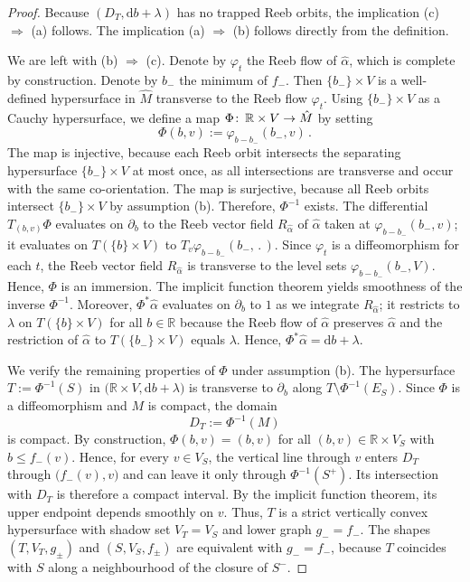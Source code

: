 \documentclass{amsart}
\theoremstyle{definition}
\def\co{\colon\thinspace}
\newcommand{\rmd}{\mathrm d}
\newcommand{\R}{\mathbb R}
\newcommand{\ra}{\rightarrow}
\begin{document}
\begin{proof}
  Because $(D_T,\rmd b+\lambda)$
  has no trapped Reeb orbits,
  the implication (c) $\Rightarrow$ (a) follows.
  The implication (a) $\Rightarrow$ (b)
  follows directly from the definition. 
  
  We are left with (b) $\Rightarrow$ (c).
  Denote by $\varphi_t$ the Reeb flow of $\hat{\alpha}$,
  which is complete by construction.
  Denote by $b_-$ the minimum of $f_-$.
  Then $\{b_-\}\times V$ is a well-defined
  hypersurface in $\hat{M}$ transverse
  to the Reeb flow $\varphi_t$.
  Using $\{b_-\}\times V$ as a Cauchy hypersurface,
  we define a map $\Phi\co\R\times V\ra\hat{M}$ by setting
  \[
    \Phi(b,v):=\varphi_{b-b_-}(b_-,v)
    \,.
  \]
  The map is injective,
  because each Reeb orbit intersects
  the separating hypersurface $\{b_-\}\times V$ at most once,
  as all intersections are transverse and
  occur with the same co-orientation.
  The map is surjective,
  because all Reeb orbits intersect $\{b_-\}\times V$
  by assumption (b).
  Therefore, $\Phi^{-1}$ exists.
  The differential $T_{(b,v)}\Phi$ evaluates on $\partial_b$ to
  the Reeb vector field $R_{\hat{\alpha}}$ of $\hat{\alpha}$
  taken at $\varphi_{b-b_-}(b_-,v)$;
  it evaluates on $T(\{b\}\times V)$ to $T_v\varphi_{b-b_-}(b_-,\,.\,)$. 
  Since $\varphi_t$ is a diffeomorphism for each $t$,
  the Reeb vector field $R_{\hat{\alpha}}$ is transverse
  to the level sets $\varphi_{b-b_-}(b_-,V)$.
  Hence, $\Phi$ is an immersion.
  The implicit function theorem yields smoothness
  of the inverse $\Phi^{-1}$.
  Moreover,
  $\Phi^*\hat{\alpha}$ evaluates on $\partial_b$ to $1$
  as we integrate $R_{\hat{\alpha}}$;
  it restricts to $\lambda$ on $T(\{b\}\times V)$ for all $b\in\R$
  because the Reeb flow of $\hat{\alpha}$ preserves $\hat{\alpha}$
  and the restriction of $\hat{\alpha}$ to $T(\{b_-\}\times V)$
  equals $\lambda$.
  Hence, $\Phi^*\hat{\alpha}=\rmd b+\lambda$.
    
  We verify the remaining properties of $\Phi$ under assumption (b).
  The hypersurface $T:=\Phi^{-1}(S)$
  in $\big(\R\times V,\rmd b+\lambda\big)$
  is transverse to $\partial_b$ along $T\setminus\Phi^{-1}(E_S)$.
  Since $\Phi$ is a diffeomorphism and $M$ is compact,
  the domain
  \[
  D_T:=\Phi^{-1}(M)
  \]
  is compact.
  By construction,
  $\Phi(b,v)=(b,v)$ for all $(b,v)\in\R\times V_S$
  with $b\leq f_-(v)$.
  Hence, for every $v\in V_S$,
  the vertical line through $v$ enters $D_T$
  through $\big(f_-(v),v\big)$
  and can leave it only through $\Phi^{-1}(S^+)$.
  Its intersection with $D_T$ is therefore a compact interval.
  By the implicit function theorem,
  its upper endpoint depends smoothly on $v$.
  Thus, $T$ is a strict vertically convex hypersurface
  with shadow set $V_T=V_S$ and lower graph $g_-=f_-$.
  The shapes $(T,V_T,g_{\pm})$ and $(S,V_S,f_{\pm})$
  are equivalent with $g_-=f_-$,
  because $T$ coincides with $S$
  along a neighbourhood of the closure of $S^-$.
  

\end{proof}
\end{document}

